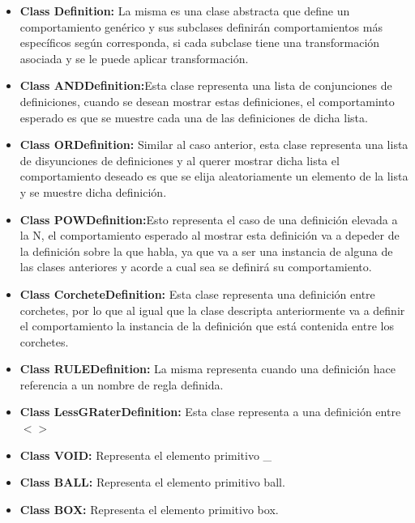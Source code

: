 \begin{itemize}

\item \textbf{Class Definition:} La misma es una clase abstracta que define un comportamiento gen\'erico y sus subclases 
definir\'an comportamientos m\'as espec\'ificos seg\'un corresponda, si cada subclase tiene una transformaci\'on asociada y se le puede aplicar transformaci\'on.

\item \textbf{Class ANDDefinition:}Esta clase representa una lista de conjunciones de definiciones, cuando se desean mostrar estas definiciones, el comportaminto esperado es que se muestre cada una de las definiciones de dicha lista.

\item \textbf{Class ORDefinition:} Similar al caso anterior, esta clase representa una lista de disyunciones de definiciones y al querer mostrar dicha lista el comportamiento deseado es que se elija aleatoriamente un elemento de la lista y se muestre dicha definici\'on.

\item \textbf{Class POWDefinition:}Esto representa el caso de una definici\'on elevada a la N, el comportamiento esperado al mostrar esta definici\'on va a depeder de la definici\'on sobre la que habla, ya que va a ser una instancia de alguna de las clases anteriores y acorde a cual sea se definir\'a su comportamiento.

\item \textbf{Class CorcheteDefinition:} Esta clase representa una definici\'on entre corchetes, por lo que al igual que la clase descripta anteriormente va a definir el comportamiento la instancia de la definici\'on que est\'a contenida entre los corchetes.

\item \textbf{Class RULEDefinition:} La misma representa cuando una definici\'on hace referencia a un nombre de regla definida. 

\item \textbf{Class LessGRaterDefinition:} Esta clase representa a una definici\'on entre $<>$

\item \textbf{Class VOID:} Representa el elemento primitivo \_

\item \textbf{Class BALL:} Representa el elemento primitivo ball.

\item \textbf{Class BOX:}  Representa el elemento primitivo box.

\end{itemize}

